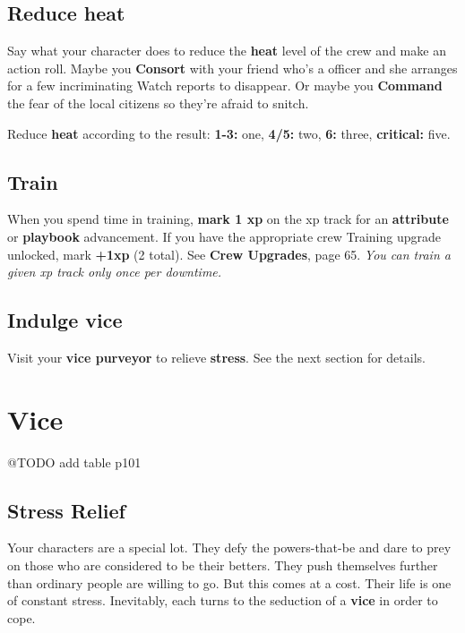 \documentclass[11pt,oneside]{book}
\newcommand{\gameterm}[1]{\textbf{#1}}
\begin{document}
\section{Reduce heat}

Say what your character does to reduce the \gameterm{heat}  level of the crew and make an action roll. Maybe you \gameterm{Consort}  with your friend who’s a officer and she arranges for a few incriminating Watch reports to disappear. Or maybe you \gameterm{Command}  the fear of the local citizens so they’re afraid to snitch.

Reduce \gameterm{heat}  according to the result: \gameterm{1-3:}  one, \gameterm{4/5:}  two, \gameterm{6:}  three, \gameterm{critical:}  five.

\section{Train}

When you spend time in training,\textbf{ mark 1 xp} on the xp track for an \textbf{attribute} or \textbf{playbook }advancement. If you have the appropriate crew Training upgrade unlocked, mark \textbf{+1}\textbf{xp} (2 total). See \textbf{Crew Upgrades}, page 65. \emph{You can train a given xp track only once per downtime.}

\section{Indulge vice}

Visit your \textbf{vice purveyor} to relieve \textbf{stress}. See the next section for details.

\chapter{Vice}

@TODO add table p101

\section{Stress Relief}

Your characters are a special lot. They defy the powers-that-be and dare to prey on those who are considered to be their betters. They push themselves further than ordinary people are willing to go. But this comes at a cost. Their life is one of constant stress. Inevitably, each turns to the seduction of a \textbf{vice} in order to cope.
\end{document}
